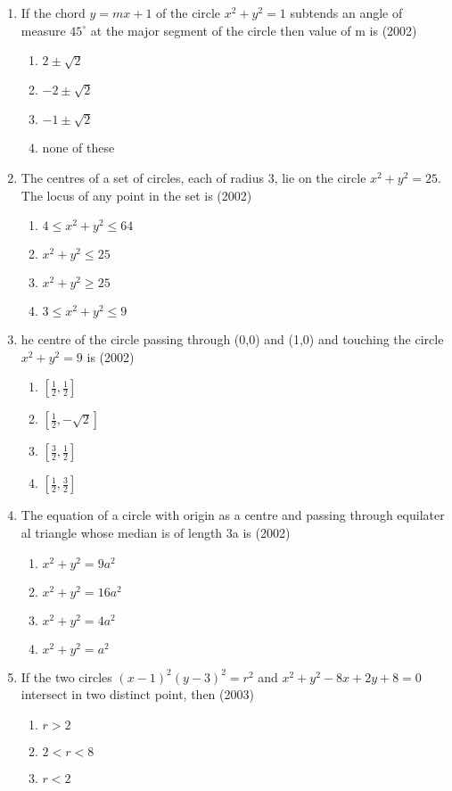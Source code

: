 \documentclass[12pt]{article}
\providecommand{\sbrak}[1]{\ensuremath{{}\left[#1\right]}}
\begin{document}
\begin{enumerate}
\item If the chord $y=mx+1$ of the circle $x^2+y^2=1$ subtends an angle of measure $45^\circ$ at the major segment of the circle then value of m is (2002)
\begin{enumerate}
\item $2\pm \sqrt{2}$
\item $-2\pm \sqrt{2}$
\item $-1\pm \sqrt{2}$
\item none of these
\end{enumerate}
\item The centres of a set of circles, each of radius 3, lie on the circle $x^2+y^2=25$. The locus of any point in the set is (2002)
\begin{enumerate}
\item $4\leq x^2+y^2\leq 64$
\item $ x^2+y^2\leq 25$
\item $x^2+y^2\geq 25$
\item $3\leq x^2+y^2\leq 9$
\end{enumerate}
\item he centre of the circle passing through (0,0) and (1,0) and touching the circle $x^2+y^2=9$ is (2002)
\begin{enumerate}
\item $\sbrak{\frac{1}{2},\frac{1}{2}}$
\item $\sbrak{\frac{1}{2},-\sqrt{2}}$
\item $\sbrak{\frac{3}{2},\frac{1}{2}}$
\item $\sbrak{\frac{1}{2},\frac{3}{2}}$
\end{enumerate}
\item The equation of a circle with origin as a centre and passing through equilater al triangle whose median is of length 3a is (2002)
\begin{enumerate}
\item $x^2+y^2=9a^2$
\item $x^2+y^2=16a^2$
\item $x^2+y^2=4a^2$
\item $x^2+y^2=a^2$
\end{enumerate}
\item If the two circles $(x-1)^2(y-3)^2=r^2$ and $x^2+y^2-8x+2y+8=0$ intersect in two distinct point, then (2003)
\begin{enumerate}
\item $r>2$
\item $2<r<8$
\item $r<2$

\end{enumerate}
\end{enumerate}
\end{document}
